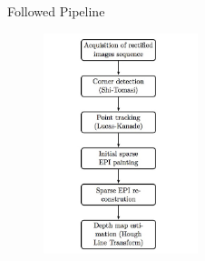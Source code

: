 \begin{frame}{Followed Pipeline}
\begin{block}{}
\begin{figure}[h!]
\includegraphics[width=0.4\textwidth]{./images/pipeline.jpg}
\end{figure}
\end{block}
\end{frame}

